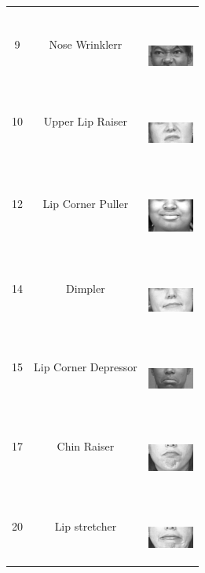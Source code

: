 \documentclass[10pt, conference, compsocconf]{IEEEtran}
\begin{document}
\begin{table}
\begin{tabular}{ccl}
		9 & Nose Wrinklerr & \ \ \ \begin{minipage} {0.1\textwidth}   
			\includegraphics[width=0.6in]{AUimage/AU9.png}  
		\end{minipage}\\
		10 & Upper Lip Raiser & \ \ \ \begin{minipage} {0.1\textwidth}   
			\includegraphics[width=0.6in]{AUimage/AU10.png}  
		\end{minipage}\\
		12 & Lip Corner Puller & \ \ \ \begin{minipage} {0.1\textwidth}   
			\includegraphics[width=0.6in]{AUimage/AU12.png}  
		\end{minipage}\\
		14 & Dimpler & \ \ \ \begin{minipage} {0.1\textwidth}   
			\includegraphics[width=0.6in]{AUimage/AU14.png}  
		\end{minipage}\\
		15 & Lip Corner Depressor & \ \ \ \begin{minipage} {0.1\textwidth}   
			\includegraphics[width=0.6in]{AUimage/AU15.png}  
		\end{minipage}\\
		17 & Chin Raiser & \ \ \ \begin{minipage} {0.1\textwidth}   
			\includegraphics[width=0.6in]{AUimage/AU17.png}  
		\end{minipage}\\
		20 & Lip stretcher & \ \ \ \begin{minipage} {0.1\textwidth}   
			\includegraphics[width=0.6in]{AUimage/AU20.png}  

\end{minipage}
\end{tabular}
\end{table}
\end{document}
